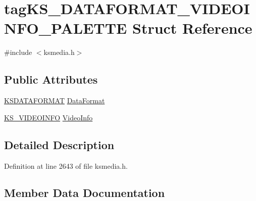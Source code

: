 \hypertarget{structtag_k_s___d_a_t_a_f_o_r_m_a_t___v_i_d_e_o_i_n_f_o___p_a_l_e_t_t_e}{}\section{tag\+K\+S\+\_\+\+D\+A\+T\+A\+F\+O\+R\+M\+A\+T\+\_\+\+V\+I\+D\+E\+O\+I\+N\+F\+O\+\_\+\+P\+A\+L\+E\+T\+TE Struct Reference}
\label{structtag_k_s___d_a_t_a_f_o_r_m_a_t___v_i_d_e_o_i_n_f_o___p_a_l_e_t_t_e}


{\ttfamily \#include $<$ksmedia.\+h$>$}

\subsection*{Public Attributes}
\begin{DoxyCompactItemize}
\item 
\hyperlink{union_k_s_d_a_t_a_f_o_r_m_a_t}{K\+S\+D\+A\+T\+A\+F\+O\+R\+M\+AT} \hyperlink{structtag_k_s___d_a_t_a_f_o_r_m_a_t___v_i_d_e_o_i_n_f_o___p_a_l_e_t_t_e_a5302cc12786aa204d269e0dc77f2138a}{Data\+Format}
\item 
\hyperlink{ksmedia_8h_a61f9c9451d471c82352c91629495a7f1}{K\+S\+\_\+\+V\+I\+D\+E\+O\+I\+N\+FO} \hyperlink{structtag_k_s___d_a_t_a_f_o_r_m_a_t___v_i_d_e_o_i_n_f_o___p_a_l_e_t_t_e_a53c7366f60dc86eb0873605e4c85b791}{Video\+Info}
\end{DoxyCompactItemize}


\subsection{Detailed Description}


Definition at line 2643 of file ksmedia.\+h.



\subsection{Member Data Documentation}
